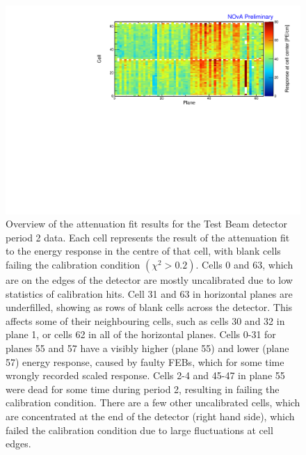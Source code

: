 \begin{figure}[!hbtp]
\centering
\includegraphics[width=\textwidth]{Plots/TBCalibration/CellResponseAtCentre_period2_Limited_NOvAPlotStyle.pdf}
\caption[Map of fitted response at cell centre for period 2 data]{Overview of the attenuation fit results for the Test Beam detector period 2 data. Each cell represents the result of the attenuation fit to the energy response in the centre of that cell, with blank cells failing the calibration condition $\left(\chi^2>0.2\right)$. Cells 0 and 63, which are on the edges of the detector are mostly uncalibrated due to low statistics of calibration hits. Cell 31 and 63 in horizontal planes are underfilled, showing as rows of blank cells across the detector. This affects some of their neighbouring cells, such as cells 30 and 32 in plane 1, or cells 62 in all of the horizontal planes. Cells 0-31 for planes 55 and 57 have a visibly higher (plane 55) and lower (plane 57) energy response, caused by faulty \glspl{FEB}, which for some time wrongly recorded scaled response. Cells 2-4 and 45-47 in plane 55 were dead for some time during period 2, resulting in failing the calibration condition. There are a few other uncalibrated cells, which are concentrated at the end of the detector (right hand side), which failed the calibration condition due to large fluctuations at cell edges.}
\label{fig:CellCentreResponsePeriod2}
\end{figure}

